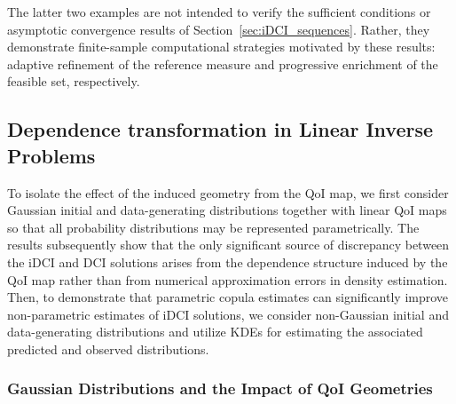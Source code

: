 \documentclass{article}
\newcounter{example}[section]
\begin{document}
The latter two examples are not intended to verify the sufficient conditions or asymptotic convergence results of Section~\ref{sec:iDCI_sequences}.
Rather, they demonstrate finite-sample computational strategies motivated by these results: adaptive refinement of the reference measure and progressive enrichment of the feasible set, respectively.

\subsection{Dependence transformation in Linear Inverse Problems}\label{subsec:copulas_linear_example}

To isolate the effect of the induced geometry from the QoI map, we first consider Gaussian initial and data-generating distributions together with linear QoI maps so that all probability distributions may be represented parametrically.
The results subsequently show that the only significant source of discrepancy between the iDCI and DCI solutions arises from the dependence structure induced by the QoI map rather than from numerical approximation errors in density estimation.
Then, to demonstrate that parametric copula estimates can significantly improve non-parametric estimates of iDCI solutions, we  consider non-Gaussian initial and data-generating distributions and utilize KDEs for estimating the associated predicted and observed distributions.

\subsubsection{Gaussian Distributions and the Impact of QoI Geometries}
\end{document}
